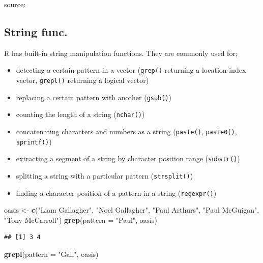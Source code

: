 \documentclass[]{book}
\newenvironment{Shaded}{\begin{snugshade}}{\end{snugshade}}
\newcommand{\KeywordTok}[1]{\textcolor[rgb]{0.13,0.29,0.53}{\textbf{{#1}}}}
\newcommand{\DataTypeTok}[1]{\textcolor[rgb]{0.13,0.29,0.53}{{#1}}}
\newcommand{\StringTok}[1]{\textcolor[rgb]{0.31,0.60,0.02}{{#1}}}
\newcommand{\NormalTok}[1]{{#1}}
\theoremstyle{definition}
\theoremstyle{definition}
\theoremstyle{remark}
\begin{document}
source: \citep{Matloff2011}

\subsection{String func.}\label{string-func.}

R has built-in string manipulation functions. They are commonly used
for;

\begin{itemize}
\item
  detecting a certain pattern in a vector (\texttt{grep()} returning a
  location index vector, \texttt{grepl()} returning a logical vector)
\item
  replacing a certain pattern with another (\texttt{gsub()})
\item
  counting the length of a string (\texttt{nchar()})
\item
  concatenating characters and numbers as a string (\texttt{paste()},
  \texttt{paste0()}, \texttt{sprintf()})
\item
  extracting a segment of a string by character position range
  (\texttt{substr()})
\item
  splitting a string with a particular pattern (\texttt{strsplit()})
\item
  finding a character position of a pattern in a string
  (\texttt{regexpr()})
\end{itemize}

\begin{Shaded}
\begin{Highlighting}[]
\NormalTok{oasis <-}\StringTok{ }\KeywordTok{c}\NormalTok{(}\StringTok{"Liam Gallagher"}\NormalTok{, }\StringTok{"Noel Gallagher"}\NormalTok{, }\StringTok{"Paul Arthurs"}\NormalTok{, }\StringTok{"Paul McGuigan"}\NormalTok{, }\StringTok{"Tony McCarroll"}\NormalTok{) }
\KeywordTok{grep}\NormalTok{(}\DataTypeTok{pattern =} \StringTok{"Paul"}\NormalTok{, oasis)}
\end{Highlighting}
\end{Shaded}

\begin{verbatim}
## [1] 3 4
\end{verbatim}

\begin{Shaded}
\begin{Highlighting}[]
\KeywordTok{grepl}\NormalTok{(}\DataTypeTok{pattern =} \StringTok{"Gall"}\NormalTok{, oasis)}
\end{Highlighting}
\end{Shaded}
\end{document}
